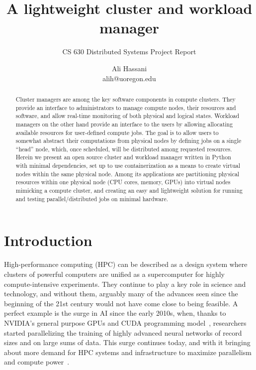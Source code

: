 \documentclass[sigconf]{acmart}
\begin{document}
\title{A lightweight cluster and workload manager}

\subtitle{CS 630 Distributed Systems Project Report}

\author{Ali Hassani\\alih@uoregon.edu}

\renewcommand{\shortauthors}{Hassani}

\begin{abstract}
    Cluster managers are among the key software components in compute clusters.
    They provide an interface to administrators to manage compute nodes, their resources and software, and allow real-time
    monitoring of both physical and logical states. Workload managers on the other hand provide an interface to the users by
    allowing allocating available resources for user-defined compute jobs.
    The goal is to allow users to somewhat abstract their computations from physical nodes by defining jobs on a single ``head''
    node, which, once scheduled, will be distributed among requested resources.
    Herein we present an open source cluster and workload manager written in Python with minimal dependencies, set up to use
    containerization as a means to create virtual nodes within the same physical node.
    Among its applications are partitioning physical resources within one physical node (CPU cores, memory, GPUs) into virtual
    nodes mimicking a compute cluster, and creating an easy and lightweight solution for running and testing 
    parallel/distributed jobs on minimal hardware.
\end{abstract}

\maketitle

\section{Introduction}

High-performance computing (HPC) can be described as a design system where clusters of powerful computers are unified as a
supercomputer for highly compute-intensive experiments.
They continue to play a key role in science and technology, and without them, arguably many of the advances seen since the
beginning of the 21st century would not have come close to being feasible.
A perfect example is the surge in AI since the early 2010s, when, thanks to NVIDIA's general purpose GPUs and CUDA programming 
model~\cite{kirk2007nvidia}, researchers started parallelizing the training of highly advanced neural networks of record sizes
and on large sums of data. This surge continues today, and with it bringing about more demand for HPC systems and
infrastructure to maximize parallelism and compute power~\cite{klenk2017relaxations}.
\end{document}

